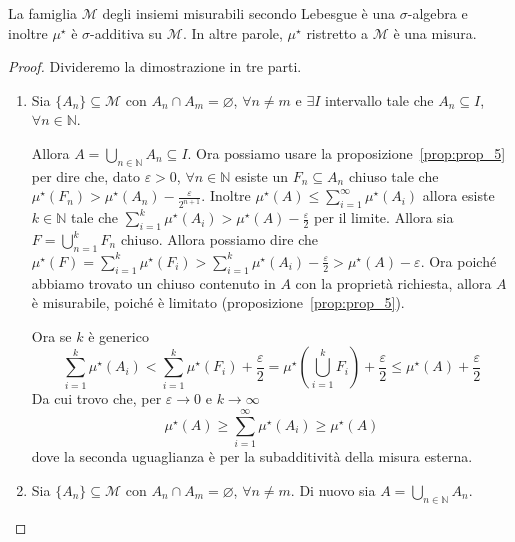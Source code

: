 \begin{theorem}
    La famiglia \(\mathcal{M}\) degli insiemi misurabili secondo Lebesgue è una
    \(\sigma\)-algebra e inoltre \(\mu^\star\) è \(\sigma\)-additiva su
    \(\mathcal{M}\). In altre parole, \(\mu^\star\) ristretto a \(\mathcal{M}\)
    è una misura.
\end{theorem}
\begin{proof}
    Divideremo la dimostrazione in tre parti.
\begin{enumerate}[label = \arabic*.]
    \item Sia \(\{A_{n}\} \subseteq \mathcal{M} \) con \(A_{n} \cap A_{m} =
        \varnothing\), \(\forall n \neq m\) e \(\exists I\) intervallo tale che
        \(A_{n} \subseteq I \), \(\forall n \in \mathbb{N}\).

        Allora \(A = \bigcup_{n \in \mathbb{N}} A_{n} \subseteq I \). Ora
        possiamo usare la proposizione~\ref{prop:prop_5} per dire che, dato
        \(\varepsilon > 0\), \(\forall n \in \mathbb{N}\) esiste un \(F_{n} \subseteq A_{n} \) chiuso tale che
        \(\mu^\star(F_{n}) > \mu^\star(A_{n}) - \frac{\varepsilon}{2^{n+1}}\).
        Inoltre \(\mu^\star(A) \le \sum_{i=1}^{\infty} \mu^\star(A_{i}) \)
        allora esiste \(k \in \mathbb{N}\) tale che \(\sum_{i=1}^{k}
        \mu^\star(A_{i}) > \mu^\star(A) - \frac{\varepsilon}{2} \) per il
        limite. Allora sia \(F = \bigcup_{n = 1}^{k} F_{n} \) chiuso. Allora
        possiamo dire che \(\mu^\star(F) = \sum_{i=1}^{k} \mu^\star(F_{i}) >
        \sum_{i=1}^{k} \mu^\star(A_{i}) - \frac{\varepsilon}{2} > \mu^\star(A) -
        \varepsilon\). Ora poiché abbiamo trovato un chiuso contenuto in \(A\)
        con la proprietà richiesta, allora \(A\) è misurabile, poiché è
        limitato (proposizione~\ref{prop:prop_5}).

        Ora se \(k\) è generico
        \[
            \sum_{i=1}^{k} \mu^\star(A_{i}) < \sum_{i=1}^{k} \mu^\star(F_{i})  +
            \frac{\varepsilon}{2} = \mu^\star\left( \bigcup_{i = 1}^{k} F_{i}
            \right) + \frac{\varepsilon}{2} \le \mu^\star(A) +
            \frac{\varepsilon}{2}
        \]
        Da cui trovo che, per \(\varepsilon \to 0\) e \(k \to \infty\) 
        \[
            \mu^\star(A) \ge \sum_{i=1}^{\infty} \mu^\star(A_{i}) \ge
            \mu^\star(A)
        \]
        dove la seconda uguaglianza è per la subadditività della misura esterna.

    \item  Sia \(\{A_{n}\} \subseteq \mathcal{M} \) con \(A_{n} \cap A_{m} =
        \varnothing\), \(\forall n \neq m\). Di nuovo sia \(A = \bigcup_{n \in
        \mathbb{N}} A_{n}\).


\end{enumerate}
\end{proof}
